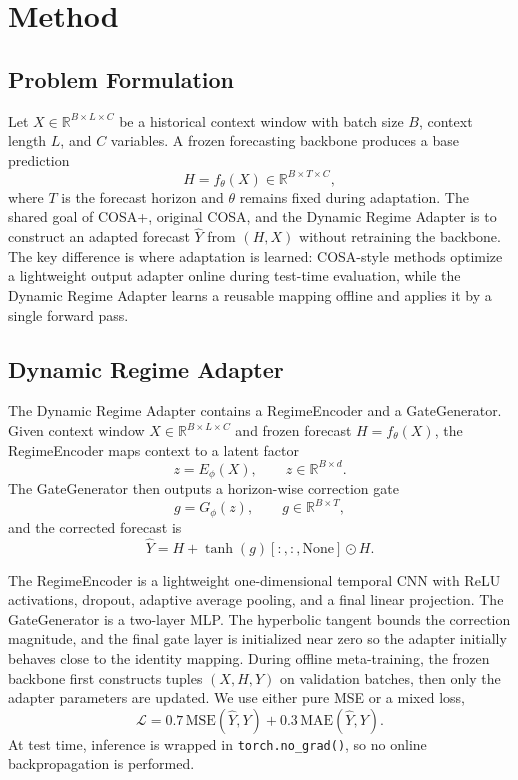 \documentclass[10pt]{article}
\begin{document}
\section{Method}
\subsection{Problem Formulation}
Let $X \in \mathbb{R}^{B \times L \times C}$ be a historical context window with batch size $B$, context length $L$, and $C$ variables. A frozen forecasting backbone produces a base prediction
\begin{equation}
  H=f_{\theta}(X) \in \mathbb{R}^{B \times T \times C},
\end{equation}
where $T$ is the forecast horizon and $\theta$ remains fixed during adaptation. The shared goal of COSA+, original COSA, and the Dynamic Regime Adapter is to construct an adapted forecast $\hat{Y}$ from $(H,X)$ without retraining the backbone. The key difference is where adaptation is learned: COSA-style methods optimize a lightweight output adapter online during test-time evaluation, while the Dynamic Regime Adapter learns a reusable mapping offline and applies it by a single forward pass.


\subsection{Dynamic Regime Adapter}
The Dynamic Regime Adapter contains a RegimeEncoder and a GateGenerator. Given context window $X \in \mathbb{R}^{B \times L \times C}$ and frozen forecast $H=f_\theta(X)$, the RegimeEncoder maps context to a latent factor
\begin{equation}
  z = E_{\phi}(X), \qquad z \in \mathbb{R}^{B \times d}.
\end{equation}
The GateGenerator then outputs a horizon-wise correction gate
\begin{equation}
  g = G_{\phi}(z), \qquad g \in \mathbb{R}^{B \times T},
\end{equation}
and the corrected forecast is
\begin{equation}
  \hat{Y}=H+\tanh(g)[:,:, \mathrm{None}] \odot H.
\end{equation}

The RegimeEncoder is a lightweight one-dimensional temporal CNN with ReLU activations, dropout, adaptive average pooling, and a final linear projection. The GateGenerator is a two-layer MLP. The hyperbolic tangent bounds the correction magnitude, and the final gate layer is initialized near zero so the adapter initially behaves close to the identity mapping. During offline meta-training, the frozen backbone first constructs tuples $(X,H,Y)$ on validation batches, then only the adapter parameters are updated. We use either pure MSE or a mixed loss,
\begin{equation}
  \mathcal{L}=0.7\,\mathrm{MSE}(\hat{Y},Y)+0.3\,\mathrm{MAE}(\hat{Y},Y).
\end{equation}
At test time, inference is wrapped in \texttt{torch.no\_grad()}, so no online backpropagation is performed.
\end{document}
